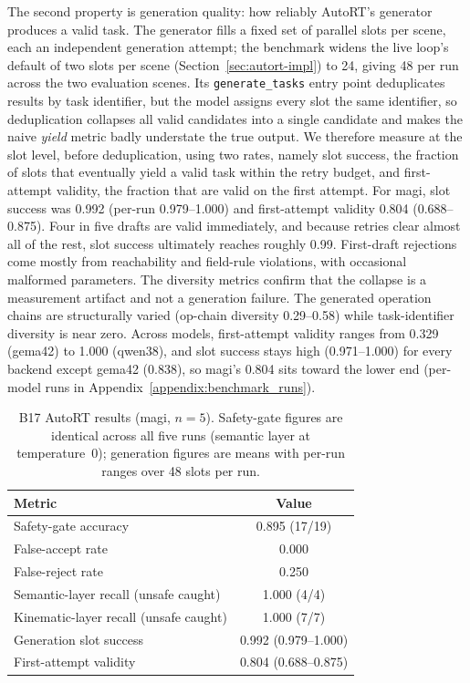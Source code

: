 The second property is generation quality: how reliably AutoRT’s generator produces a valid task. The generator fills a fixed set of parallel slots per scene, each an independent generation attempt; the benchmark widens the live loop’s default of two slots per scene (Section~\ref{sec:autort-impl}) to 24, giving 48 per run across the two evaluation scenes. Its \texttt{generate\_tasks} entry point deduplicates results by task identifier, but the model assigns every slot the same identifier, so deduplication collapses all valid candidates into a single candidate and makes the naive \textit{yield} metric badly understate the true output. We therefore measure at the slot level, before deduplication, using two rates, namely slot success, the fraction of slots that eventually yield a valid task within the retry budget, and first-attempt validity, the fraction that are valid on the first attempt. For \gls{magi}, slot success was 0.992 (per-run 0.979–1.000) and first-attempt validity 0.804 (0.688–0.875). Four in five drafts are valid immediately, and because retries clear almost all of the rest, slot success ultimately reaches roughly 0.99. First-draft rejections come mostly from reachability and field-rule violations, with occasional malformed parameters. The diversity metrics confirm that the collapse is a measurement artifact and not a generation failure. The generated operation chains are structurally varied (op-chain diversity 0.29–0.58) while task-identifier diversity is near zero. Across models, first-attempt validity ranges from 0.329 (\gls{gema42}) to 1.000 (\gls{qwen38}), and slot success stays high (0.971–1.000) for every backend except \gls{gema42} (0.838), so \gls{magi}'s 0.804 sits toward the lower end (per-model runs in Appendix~\ref{appendix:benchmark_runs}).

\begin{table}[t]
	\centering
	\begin{tabular}{lc}
		\hline
		\textbf{Metric}                        & \textbf{Value}      \\
		\hline
		Safety-gate accuracy                   & 0.895 (17/19)       \\
		False-accept rate                      & 0.000               \\
		False-reject rate                      & 0.250               \\
		Semantic-layer recall (unsafe caught)  & 1.000 (4/4)         \\
		Kinematic-layer recall (unsafe caught) & 1.000 (7/7)         \\
		Generation slot success                & 0.992 (0.979–1.000) \\
		First-attempt validity                 & 0.804 (0.688–0.875) \\
		\hline
	\end{tabular}
	\caption{B17 AutoRT results (\gls{magi}, $n=5$). Safety-gate figures are identical across all five runs (semantic layer at temperature~0); generation figures are means with per-run ranges over 48 slots per run.}
	\label{tab:b17-results}
\end{table}

